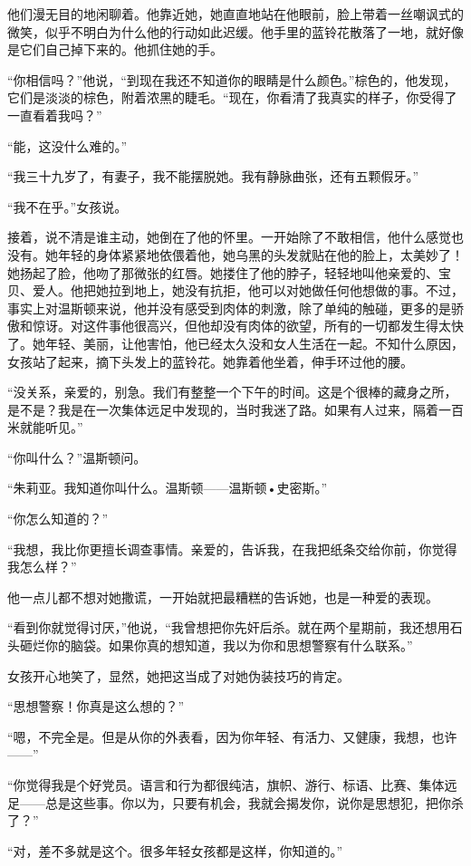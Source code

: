他们漫无目的地闲聊着。他靠近她，她直直地站在他眼前，脸上带着一丝嘲讽式的微笑，似乎不明白为什么他的行动如此迟缓。他手里的蓝铃花散落了一地，就好像是它们自己掉下来的。他抓住她的手。

``你相信吗？''他说，``到现在我还不知道你的眼睛是什么颜色。''棕色的，他发现，它们是淡淡的棕色，附着浓黑的睫毛。``现在，你看清了我真实的样子，你受得了一直看着我吗？''

``能，这没什么难的。''

``我三十九岁了，有妻子，我不能摆脱她。我有静脉曲张，还有五颗假牙。''

``我不在乎。''女孩说。

接着，说不清是谁主动，她倒在了他的怀里。一开始除了不敢相信，他什么感觉也没有。她年轻的身体紧紧地依偎着他，她乌黑的头发就贴在他的脸上，太美妙了！她扬起了脸，他吻了那微张的红唇。她搂住了他的脖子，轻轻地叫他亲爱的、宝贝、爱人。他把她拉到地上，她没有抗拒，他可以对她做任何他想做的事。不过，事实上对温斯顿来说，他并没有感受到肉体的刺激，除了单纯的触碰，更多的是骄傲和惊讶。对这件事他很高兴，但他却没有肉体的欲望，所有的一切都发生得太快了。她年轻、美丽，让他害怕，他已经太久没和女人生活在一起。不知什么原因，女孩站了起来，摘下头发上的蓝铃花。她靠着他坐着，伸手环过他的腰。

``没关系，亲爱的，别急。我们有整整一个下午的时间。这是个很棒的藏身之所，是不是？我是在一次集体远足中发现的，当时我迷了路。如果有人过来，隔着一百米就能听见。''

``你叫什么？''温斯顿问。

``朱莉亚。我知道你叫什么。温斯顿——温斯顿•史密斯。''

``你怎么知道的？''

``我想，我比你更擅长调查事情。亲爱的，告诉我，在我把纸条交给你前，你觉得我怎么样？''

他一点儿都不想对她撒谎，一开始就把最糟糕的告诉她，也是一种爱的表现。

``看到你就觉得讨厌，''他说，``我曾想把你先奸后杀。就在两个星期前，我还想用石头砸烂你的脑袋。如果你真的想知道，我以为你和思想警察有什么联系。''

女孩开心地笑了，显然，她把这当成了对她伪装技巧的肯定。

``思想警察！你真是这么想的？''

``嗯，不完全是。但是从你的外表看，因为你年轻、有活力、又健康，我想，也许——''

``你觉得我是个好党员。语言和行为都很纯洁，旗帜、游行、标语、比赛、集体远足——总是这些事。你以为，只要有机会，我就会揭发你，说你是思想犯，把你杀了？''

``对，差不多就是这个。很多年轻女孩都是这样，你知道的。''

